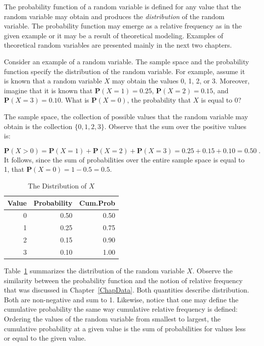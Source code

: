 \documentclass[
]{krantz}
\newcommand{\Prob}{\mathbf{P}}
\theoremstyle{definition}
\theoremstyle{definition}
\theoremstyle{definition}
\theoremstyle{remark}
\begin{document}
The probability function of a random variable is defined for any value
that the random variable may obtain and produces the \emph{distribution} of
the random variable. The probability function may emerge as a relative
frequency as in the given example or it may be a result of theoretical
modeling. Examples of theoretical random variables are presented mainly
in the next two chapters.

Consider an example of a random variable. The sample space and the
probability function specify the distribution of the random variable.
For example, assume it is known that a random variable \(X\) may obtain
the values 0, 1, 2, or 3. Moreover, imagine that it is known that
\(\Prob(X=1) = 0.25\), \(\Prob(X=2) = 0.15\), and \(\Prob(X=3)= 0.10\). What
is \(\Prob(X=0)\), the probability that \(X\) is equal to 0?

The sample space, the collection of possible values that the random
variable may obtain is the collection \(\{0,1,2,3\}\). Observe that the
sum over the positive values is:

\[\Prob(X > 0) = \Prob(X=1) + \Prob(X=2) + \Prob(X=3) = 0.25 + 0.15 + 0.10 = 0.50\;.\]
It follows, since the sum of probabilities over the entire sample space
is equal to 1, that \(\Prob(X=0) = 1- 0.5 = 0.5\).

\begin{table}[t]

\caption{\label{tab:Probability1}The Distribution of $X$}
\centering
\begin{tabular}{rrr}
\toprule
Value & Probability & Cum.Prob\\
\midrule
0 & 0.50 & 0.50\\
1 & 0.25 & 0.75\\
2 & 0.15 & 0.90\\
3 & 0.10 & 1.00\\
\bottomrule
\end{tabular}
\end{table}

Table~\ref{tab:Probability1} summarizes the distribution of the random
variable \(X\). Observe the similarity between the probability function
and the notion of relative frequency that was discussed in
Chapter~\ref{ChapData}. Both quantities describe distribution. Both are
non-negative and sum to 1. Likewise, notice that one may define the
cumulative probability the same way cumulative relative frequency is
defined: Ordering the values of the random variable from smallest to
largest, the cumulative probability at a given value is the sum of
probabilities for values less or equal to the given value.
\end{document}
